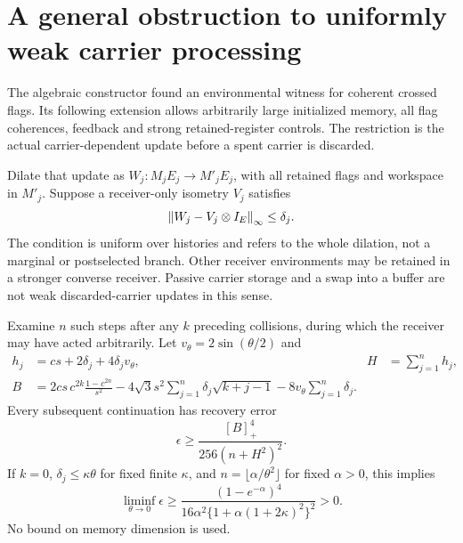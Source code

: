 \section{A general obstruction to uniformly weak carrier processing}
The algebraic constructor found an environmental witness for coherent crossed
flags. Its following extension allows arbitrarily large initialized memory,
all flag coherences, feedback and strong retained-register controls. The
restriction is the actual carrier-dependent update before a spent carrier is
discarded.

Dilate that update as $W_j:M_jE_j\to M'_jE_j$, with all retained flags and
workspace in $M'_j$. Suppose a receiver-only isometry $V_j$ satisfies
\begin{equation}
 \left\lVert W_j-V_j\otimes I_E\right\rVert_\infty\le\delta_j.\label{eq:weakcondition}
\end{equation}
The condition is uniform over histories and refers to the whole dilation,
not a marginal or postselected branch. Other receiver environments may be
retained in a stronger converse receiver. Passive carrier storage and a swap
into a buffer are not weak discarded-carrier updates in this sense.

\begin{theorem}
Examine $n$ such steps after any $k$ preceding collisions, during which the
receiver may have acted arbitrarily. Let $v_\theta=2\sin(\theta/2)$ and
\begin{align}
 h_j&=cs+2\delta_j+4\delta_jv_\theta,&H&=\sum_{j=1}^nh_j,\\
 B&=2cs\,c^{2k}\frac{1-c^{2n}}{s^2}
 -4\sqrt3s^2\sum_{j=1}^n\delta_j\sqrt{k+j-1}
 -8v_\theta\sum_{j=1}^n\delta_j.\nonumber
\end{align}
Every subsequent continuation has recovery error
\begin{equation}
 \epsilon\ge\frac{[B]_+^4}{256(n+H^2)^2}.\label{eq:weakfinite}
\end{equation}
If $k=0$, $\delta_j\le\kappa\theta$ for fixed finite $\kappa$, and
$n=\lfloor\alpha/\theta^2\rfloor$ for fixed $\alpha>0$, this implies
\begin{equation}
 \liminf_{\theta\to0}\epsilon\ge
 \frac{(1-e^{-\alpha})^4}
 {16\alpha^2\{1+\alpha(1+2\kappa)^2\}^2}>0.\label{eq:weakfloor}
\end{equation}
No bound on memory dimension is used.
\end{theorem}

